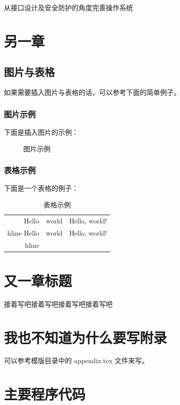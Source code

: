 \documentclass{swfcthesis}
\begin{document}
从接口设计及安全防护的角度完善操作系统


\chapter{另一章}

\section{图片与表格}

如果需要插入图片与表格的话，可以参考下面的简单例子。

\subsection{图片示例}

下面是插入图片的示例：

\begin{figure}[!ht]
  \centering
  \caption{图片示例}
  \label{fig:hello}
\end{figure}

\subsection{表格示例}

下面是一个表格的例子：

\begin{table}[!ht]
  \centering
  \begin{tabular}{|r|c|l|}    \hline
    Hello&world&Hello, world!\\hline
    Hello&world&Hello, world!\\hline
  \end{tabular}
  \caption{表格示例}
\end{table}

\chapter{又一章标题}

接着写吧接着写吧接着写吧接着写吧


\Appendix{}
\printbibliography[heading={bibintoc},title={参考文献}] %
\advisorinfopage{}                 %
\acknowledgmentspage{}             %


\chapter{我也不知道为什么要写附录} %

可以参考模版目录中的 appendix.tex 文件来写。

\chapter{主要程序代码} %


\begin{listing}[H]
\end{listing}  
\end{document}
